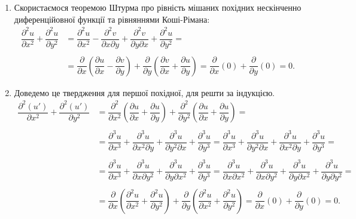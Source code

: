 \begin{solution}
    \begin{enumerate}
        \item Скористаємося теоремою Штурма про рівність мішаних похідних нескінченно диференційовної функції та рівняннями Коші-Рімана:
        \begin{align*}
            \dfrac{\partial^2 u}{\partial x^2} + \dfrac{\partial^2 u}{\partial y^2} &= \dfrac{\partial^2 u}{\partial x^2} - \dfrac{\partial^2 v}{\partial x \partial y} + \dfrac{\partial^2 v}{\partial y \partial x} + \dfrac{\partial^2 u}{\partial y^2} = \\
            \\
            &= \dfrac{\partial}{\partial x} \left(\dfrac{\partial u}{\partial x} - \dfrac{\partial v}{\partial y}\right) + \dfrac{\partial}{\partial y} \left( \dfrac{\partial v}{\partial x} + \dfrac{\partial u}{\partial y}\right) = \dfrac{\partial}{\partial x} (0) + \dfrac{\partial}{\partial y} (0) = 0.    
        \end{align*}
        
        \item Доведемо це твердження для першої похідної, для решти за індукцією.
        \begin{align*}
            \dfrac{\partial^2 (u')}{\partial x^2} + \dfrac{\partial^2 (u')}{\partial y^2} &= \dfrac{\partial^2}{\partial x^2} \left(\dfrac{\partial u}{\partial x} + \dfrac{\partial u}{\partial y}\right) + \dfrac{\partial^2}{\partial y^2} \left(\dfrac{\partial u}{\partial x} + \dfrac{\partial u}{\partial y}\right) = \\    
            \\
            &= \dfrac{\partial^3 u}{\partial x^3} + \dfrac{\partial^3 u}{\partial x^2 \partial y} + \dfrac{\partial^3 u}{\partial y^2 \partial x} + \dfrac{\partial^3 u}{\partial y^3} = \dfrac{\partial^3 u}{\partial x^3} + \dfrac{\partial^3 u}{\partial y^2 \partial x} + \dfrac{\partial^3 u}{\partial x^2 \partial y} + \dfrac{\partial^3 u}{\partial y^3} = \\
            \\
            &= \dfrac{\partial^3 u}{\partial x^3} + \dfrac{\partial^3 u}{\partial x \partial y^2} + \dfrac{\partial^3 u}{\partial y \partial x^2} + \dfrac{\partial^3 u}{\partial y^3} = \dfrac{\partial^3 u}{\partial x \partial x^2} + \dfrac{\partial^3 u}{\partial x \partial y^2} + \dfrac{\partial^3 u}{\partial y \partial x^2} + \dfrac{\partial^3 u}{\partial y \partial y^2} = \\
            \\
            &= \dfrac{\partial}{\partial x} \left(\dfrac{\partial^2 u}{\partial x^2} + \dfrac{\partial^2 u}{\partial y^2}\right) + \dfrac{\partial}{\partial y} \left(\dfrac{\partial^2 u}{\partial x^2} + \dfrac{\partial^2 u}{\partial y^2} \right) = \dfrac{\partial}{\partial x} (0) + \dfrac{\partial}{\partial y} (0) = 0.
        \end{align*}
    \end{enumerate}
\end{solution}

